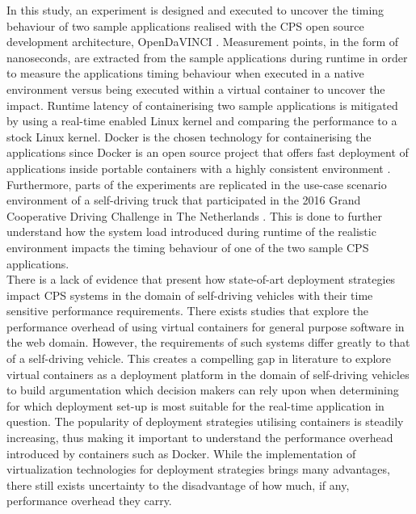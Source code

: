 In this study, an experiment is designed and executed to uncover the timing behaviour of two sample applications realised with the CPS open source development architecture, OpenDaVINCI \cite{OpenDaVINCI}. Measurement points, in the form of nanoseconds, are extracted from the sample applications during runtime in order to measure the applications timing behaviour when executed in a native environment versus being executed within a virtual container to uncover the impact. Runtime latency of containerising two sample applications is mitigated by using a real-time enabled Linux kernel and comparing the performance to a stock Linux kernel. Docker \cite{whatdocker} is the chosen technology for containerising the applications since Docker is an open source project that offers fast deployment of applications inside portable containers with a highly consistent environment \cite{bernstein2014containers}. Furthermore, parts of the experiments are replicated in the use-case scenario environment of a self-driving truck that participated in the 2016 Grand Cooperative Driving Challenge in The Netherlands \cite{gcdc}. This is done to further understand how the system load introduced during runtime of the realistic environment impacts the timing behaviour of one of the two sample CPS applications.\\

There is a lack of evidence that present how state-of-art deployment strategies impact CPS systems in the domain of self-driving vehicles with their time sensitive performance requirements. There exists studies that explore the performance overhead of using virtual containers for general purpose software in the web domain. However, the requirements of such systems differ greatly to that of a self-driving vehicle. This creates a compelling gap in literature to explore virtual containers as a deployment platform in the domain of self-driving vehicles to build argumentation which decision makers can rely upon when determining for which deployment set-up is most suitable for the real-time application in question. The popularity of deployment strategies utilising containers is steadily increasing, thus making it important to understand the performance overhead introduced by containers such as Docker. While the implementation of virtualization technologies for deployment strategies brings many advantages, there still exists uncertainty to the disadvantage of how much, if any, performance overhead they carry.\\

